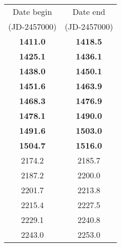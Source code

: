 \begin{table*}
\begin{tabular}{cc}
\hline
%
            Date begin  & Date end \\ 
            (JD-2457000) & (JD-2457000) \\ 
\hline
%
            {\bf 1411.0} & {\bf 1418.5} \\  
            {\bf 1425.1} & {\bf 1436.1} \\  
            {\bf 1438.0} & {\bf 1450.1} \\  
            {\bf 1451.6} & {\bf 1463.9} \\  
            {\bf 1468.3} & {\bf 1476.9} \\  
            {\bf 1478.1} & {\bf 1490.0} \\  
            {\bf 1491.6} & {\bf 1503.0} \\  
            {\bf 1504.7} & {\bf 1516.0} \\  
                 2174.2  &      2185.7 \\  
                 2187.2  &      2200.0 \\  
                 2201.7  &      2213.8 \\  
                 2215.4  &      2227.5 \\  
                 2229.1  &      2240.8 \\  
                 2243.0  &      2253.0 \\  
%
\hline
\end{tabular}
\end{table*}
